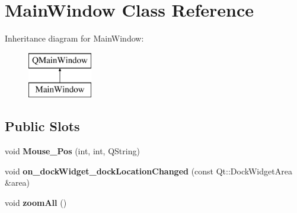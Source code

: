 \hypertarget{class_main_window}{}\section{Main\+Window Class Reference}
\label{class_main_window}
Inheritance diagram for Main\+Window\+:\begin{figure}[H]
\begin{center}
\leavevmode
\includegraphics[height=2.000000cm]{class_main_window}
\end{center}
\end{figure}
\subsection*{Public Slots}
\begin{DoxyCompactItemize}
\item 
\mbox{\label{class_main_window_ac75c49fcb857f8b17cd290ecb4fa3e5f}} 
void {\bfseries Mouse\+\_\+\+Pos} (int, int, Q\+String)
\item 
\mbox{\label{class_main_window_a831bb98fbc080b610bd3f8128829333c}} 
void {\bfseries on\+\_\+dock\+Widget\+\_\+dock\+Location\+Changed} (const Qt\+::\+Dock\+Widget\+Area \&area)
\item 
\mbox{\label{class_main_window_a817a56c776dffb059987b50372e45482}} 
void {\bfseries zoom\+All} ()
\end{DoxyCompactItemize}
